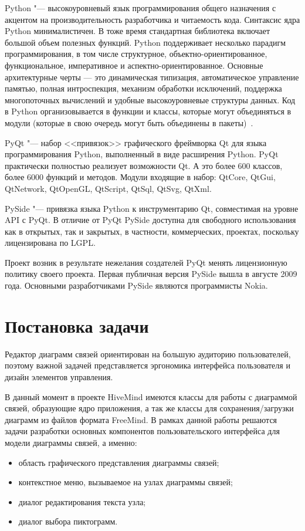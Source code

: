 Python "--- высокоуровневый язык программирования общего назначения с акцентом на производительность разработчика и читаемость кода. Синтаксис ядра Python минималистичен. В тоже время стандартная библиотека включает большой объем полезных функций. Python поддерживает несколько парадигм программирования, в том числе структурное, объектно-ориентированное, функциональное, императивное и аспектно-ориентированное. Основные архитектурные черты --- это динамическая типизация, автоматическое управление памятью, полная интроспекция, механизм обработки исключений, поддержка многопоточных вычислений и удобные высокоуровневые структуры данных. Код в Python организовывается в функции и классы, которые могут объединяться в модули (которые в свою очередь могут быть объединены в пакеты)~\cite{python}.

PyQt "--- набор <<привязок>> графического фреймворка Qt для языка программирования Python, выполненный в виде расширения Python. PyQt практически полностью реализует возможности Qt. А это более 600 классов, более 6000 функций и методов. Модули входящие в набор: QtCore,
QtGui, QtNetwork, QtOpenGL, QtScript, QtSql, QtSvg, QtXml.

PySide "--- привязка языка Python к инструментарию Qt, совместимая на уровне API с PyQt. В отличие от PyQt PySide доступна для свободного использования как в открытых, так и закрытых, в частности, коммерческих, проектах, поскольку лицензирована по LGPL.

Проект возник в результате нежелания создателей PyQt менять лицензионную политику своего проекта.
Первая публичная версия PySide вышла в августе 2009 года. Основными разработчиками PySide являются программисты Nokia.

\section{Постановка задачи}\label{sec:statement_task}

Редактор диаграмм связей ориентирован на большую аудиторию пользователей, поэтому важной задачей представляется эргономика интерфейса пользователя и дизайн элементов управления.

В данный момент в проекте HiveMind имеются классы для работы с диаграммой связей, образующие ядро приложения, а так же классы для сохранения/загрузки диаграмм из файлов формата FreeMind.
В рамках данной работы решаются задачи разработки основных компонентов пользовательского интерфейса для модели диаграммы связей, а именно:
\begin{itemize}
\item
область графического представления диаграммы связей;
\item
контекстное меню, вызываемое на узлах диаграммы связей;
\item
диалог редактирования текста узла;
\item
диалог выбора пиктограмм.
\end{itemize}

